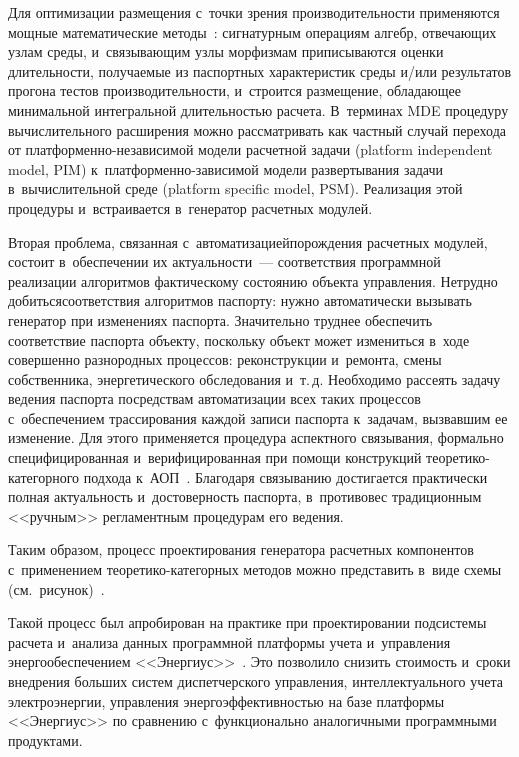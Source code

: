 \begin{multicols}{2}
Для оптимизации 
размещения с~точки зрения производительности применяются мощные 
математические методы~\cite{27-kov}: сигнатурным операциям алгебр, 
отвечающих узлам среды, и~связывающим узлы морфизмам приписываются 
оценки длительности, получаемые из паспортных характеристик среды и/или 
результатов прогона тес\-тов производительности, и~строится размещение, 
обладающее минимальной интегральной длительностью расчета. В~терминах 
MDE процедуру вы\-чис\-ли\-тель\-но\-го расширения можно рассматривать как 
частный случай перехода от плат\-фор\-мен\-но-не\-за\-ви\-си\-мой модели 
расчетной задачи (platform independent model, PIM)  
к~плат\-фор\-мен\-но-за\-ви\-си\-мой модели развертывания задачи 
в~вычислительной среде (platform specific model, PSM). Реализация этой 
процедуры и~встраивается в~генератор расчетных модулей.
   
   Вторая проблема, связанная с~автоматизацией\linebreak порождения расчетных 
модулей, состоит в~обеспечении их актуальности~--- соответствия про\-грам\-мной 
реализации алгоритмов фактическому состоянию объекта управления. 
Нетрудно добиться\linebreak соответствия алгоритмов паспорту: нужно авто\-матически 
вызывать генератор при изменениях паспорта. Значительно труднее обеспечить 
соот\-ветствие паспорта объекту, поскольку объект может %
 изме\-ниться в~ходе 
совершенно разнородных процессов: реконструкции и~ремонта, смены 
собственника, энергетического обследования и~т.\,д. Необходимо рассеять 
задачу ведения паспорта по\linebreak средствам автоматизации всех таких процес\-сов 
с~обеспечением трассирования каждой записи паспорта к~задачам, вызвавшим 
ее изменение. Для этого применяется процедура аспектного связывания, 
формально специфицированная и~верифицированная при помощи конструкций 
тео\-ре\-ти\-ко-ка\-те\-гор\-но\-го подхода к~АОП~\cite{20-kov}. Благодаря 
связыванию достигается практически полная актуальность и~достоверность 
паспорта, в~противовес традиционным <<ручным>> регламентным процедурам 
его ведения.
   
   Таким образом, процесс проектирования генератора расчетных компонентов 
с~применением тео\-ре\-ти\-ко-ка\-те\-гор\-ных методов можно представить в~виде
схемы (см.\ рисунок)~\cite{28-kov}. 



   Такой процесс был апробирован на практике при проектировании 
подсистемы расчета и~анализа данных программной платформы учета 
и~управ\-ле\-ния энергообеспечением <<Энергиус>>~\cite{29-kov}. Это позволило 
снизить стоимость и~сроки внедрения больших систем диспетчерского 
управ\-ле\-ния, интеллектуального учета электроэнергии, управления 
энергоэффективностью на базе платформы <<Энергиус>> по сравнению 
с~функционально аналогичными программными продуктами.


\end{multicols}
